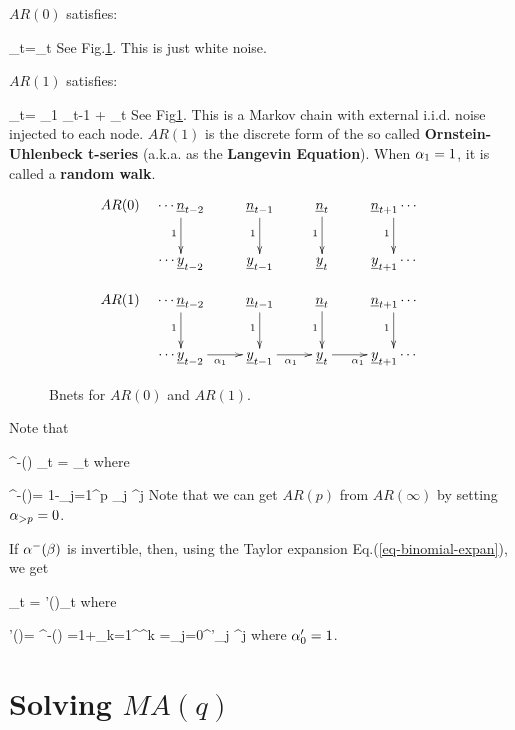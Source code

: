 $AR(0)$ satisfies:

\beq
\rvy_t=\rvn_t
\eeq
See Fig.\ref{fig-AR-0-1}.
This is just white noise.


$AR(1)$ satisfies:

\beq
\rvy_t= \alp_1 \rvy_{t-1} + \rvn_t
\eeq
See Fig\ref{fig-AR-0-1}.
This  is a Markov chain
with external i.i.d. noise injected
to each node.
$AR(1)$
is the discrete
form of the
so called {\bf Ornstein-Uhlenbeck
 t-series} (a.k.a. as the {\bf Langevin
 Equation}).
 When $\alpha_1=1$,
it is called a {\bf random walk}.

\begin{figure}[h!]
$$
\begin{array}{cc}
AR(0)&
\xymatrix{
\cdots
\rvn_{t-2}\ar[d]_1
&\rvn_{t-1}\ar[d]_1
&\rvn_{t}\ar[d]_1
&\rvn_{t+1}\ar[d]_1
\cdots
\\
\cdots
\rvy_{t-2}
&\rvy_{t-1}
&\rvy_{t}
&\rvy_{t+1}
\cdots
}
\\
\\
AR(1)&
\xymatrix{
\cdots
\rvn_{t-2}\ar[d]_1
&\rvn_{t-1}\ar[d]_1
&\rvn_{t}\ar[d]_1
&\rvn_{t+1}\ar[d]_1
\cdots
\\
\cdots
\rvy_{t-2}\ar[r]_{\alp_1}
&\rvy_{t-1}\ar[r]_{\alp_1}
&\rvy_{t}\ar[r]_{\alp_1}
&\rvy_{t+1}
\cdots
}
\end{array}
$$
\caption{Bnets for $AR(0)$ and $AR(1)$.}
\label{fig-AR-0-1}
\end{figure}


Note that

\beq
\alp^-(\calb)
\rvy_t = \rvn_t
\label{eq-ar-alp-minus}
\;
\eeq
where

\beq
\alp^-(\calb)=
1-\sum_{j=1}^p
 \alp_j \calb^j
\eeq
Note that we can get $AR(p)$
from $AR(\infty)$
by setting $\alpha_{>p}=0$.


If $\alpha^-(\beta)$
is invertible, then, using
the Taylor expansion
Eq.(\ref{eq-binomial-expan}), we get

\beq
\rvy_t = \alp'(\calb)\rvn_t
\eeq
where

\beq
\alp'(\calb)=
{\alp^-(\calb)}
=1+\sum_{k=1}^\infty\left[\sum_{j=1}^p\alp_j \calb^j
\right]^k
=\sum_{j=0}^\infty \alp'_j \calb^j
\eeq
where $\alpha'_0=1$.








\section{Solving $MA(q)$}

